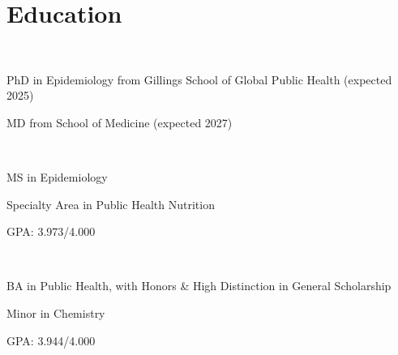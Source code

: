 \section{Education} 

\\
\begin{tightemize}
\setlength{\itemindent}{-.25in}
\item []PhD in Epidemiology from Gillings School of Global Public Health (expected 2025)
\item []MD from School of Medicine (expected 2027)

\end{tightemize}
\sectionsep

\\
\begin{tightemize}
\setlength{\itemindent}{-.25in}
\item []MS in Epidemiology
\item []Specialty Area in Public Health Nutrition\\
\item []GPA: 3.973/4.000\\
\end{tightemize}
\sectionsep

\\
\begin{tightemize}
\setlength{\itemindent}{-.25in}
\item []BA in Public Health, with Honors \& High Distinction in General Scholarship
\item []Minor in Chemistry
\item []GPA: 3.944/4.000
\end{tightemize}
\sectionsep


